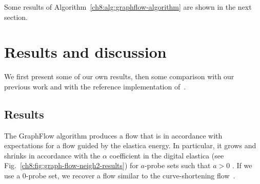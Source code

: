 \documentclass[runningheads]{llncs}
\newcommand{\daniel}[1]{ {\color{blue}#1} }
\begin{document}
Some results of Algorithm~\ref{ch8:alg:graphflow-algorithm} are shown in the next section.

\section{Results and discussion}
We first present some of our own results, then some comparison with our previous work and with the reference
implementation of~\cite{schoenemann09linear}.

\subsection{Results}
The GraphFlow algorithm produces a flow that is in accordance with expectations for a flow guided by the elastica
energy. In particular, it grows and shrinks in accordance with the $\alpha$ coefficient in the digital elastica
(see Fig.~\ref{ch8:fig:graph-flow-neigh2-results}) \daniel{for $a$-probe sets such that $a>0$}. \daniel{If we use a $0$-probe set, we recover a flow similar to the curve-shortening flow~\cite{huisken84flow}.}
\end{document}
